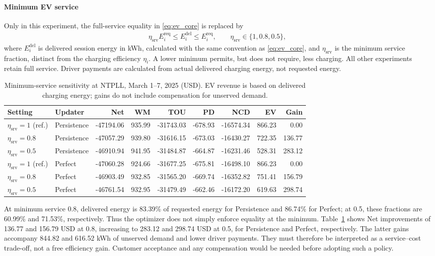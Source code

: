 \documentclass[final,5p,times]{elsarticle}
\newcommand{\req}{\mathrm{req}}
\begin{document}
\paragraph{Minimum EV service}
Only in this experiment, the full-service equality in \eqref{eq:ev_core}
is replaced by
\begin{align}
\eta_{\mathrm{srv}}E_i^{\req}
\le E_i^{\mathrm{del}} \le E_i^{\req},\qquad
\eta_{\mathrm{srv}}\in\{1,0.8,0.5\},
\label{eq:sensitivity_service}
\end{align}
where $E_i^{\mathrm{del}}$ is delivered session energy in kWh, calculated
with the same convention as \eqref{eq:ev_core}, and
$\eta_{\mathrm{srv}}$ is the minimum service fraction, distinct from the
charging efficiency $\eta_i$. A lower minimum permits, but does not require,
less charging. All other experiments retain full service. Driver payments
are calculated from actual delivered charging energy, not requested energy.
\begin{table}[p]
\centering
\caption{Minimum-service sensitivity at NTPLL, March 1--7, 2025 (USD). EV revenue is based on delivered charging energy; gains do not include compensation for unserved demand.}
\label{tab:weekly_eta}
\footnotesize
\setlength{\tabcolsep}{3pt}
\begin{tabular}{llrrrrrrr}
\toprule
Setting & Updater & Net & WM & TOU & PD & NCD & EV & Gain \\
\midrule
$\eta_{\mathrm{srv}}=1$ (ref.) & Persistence & -47194.06 & 935.99 & -31743.03 & -678.93 & -16574.34 & 866.23 & 0.00 \\
$\eta_{\mathrm{srv}}=0.8$ & Persistence & -47057.29 & 939.80 & -31616.15 & -673.03 & -16430.27 & 722.35 & 136.77 \\
$\eta_{\mathrm{srv}}=0.5$ & Persistence & -46910.94 & 941.95 & -31484.87 & -664.87 & -16231.46 & 528.31 & 283.12 \\
\midrule
$\eta_{\mathrm{srv}}=1$ (ref.) & Perfect & -47060.28 & 924.66 & -31677.25 & -675.81 & -16498.10 & 866.23 & 0.00 \\
$\eta_{\mathrm{srv}}=0.8$ & Perfect & -46903.49 & 932.85 & -31565.20 & -669.74 & -16352.82 & 751.41 & 156.79 \\
$\eta_{\mathrm{srv}}=0.5$ & Perfect & -46761.54 & 932.95 & -31479.49 & -662.46 & -16172.20 & 619.63 & 298.74 \\
\bottomrule
\end{tabular}
\end{table}

At minimum service 0.8, delivered energy is 83.39\% of requested energy for
Persistence and 86.74\% for Perfect; at 0.5, these fractions are 60.99\% and
71.53\%, respectively. Thus the optimizer does not simply enforce equality
at the minimum. Table~\ref{tab:weekly_eta} shows Net improvements of 136.77
and 156.79 USD at 0.8, increasing to 283.12 and 298.74 USD at 0.5, for
Persistence and Perfect, respectively. The latter gains accompany 844.82
and 616.52 kWh of unserved demand and lower driver payments. They must
therefore be interpreted as a service--cost trade-off, not a free efficiency
gain. Customer acceptance and any compensation would be needed before
adopting such a policy.
\end{document}
